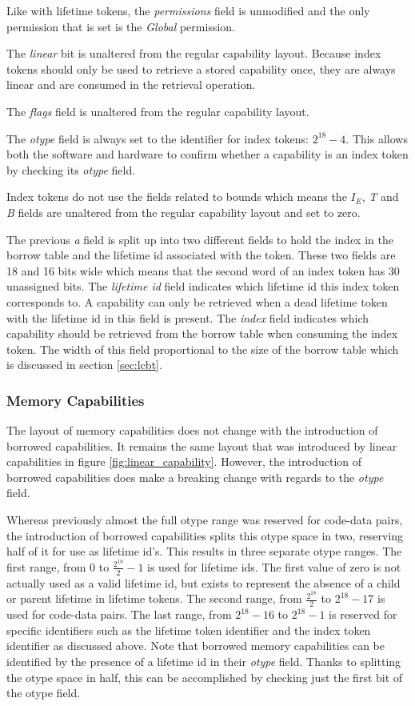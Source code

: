 Like with lifetime tokens, the \textit{permissions} field is unmodified and the only permission that is set is the \textit{Global} permission.

The \textit{linear} bit is unaltered from the regular capability layout. Because index tokens should only be used to retrieve a stored capability once, they are always linear and are consumed in the retrieval operation.

The \textit{flags} field is unaltered from the regular capability layout.

The \textit{otype} field is always set to the identifier for index tokens: $2^{18} - 4$. This allows both the software and hardware to confirm whether a capability is an index token by checking its \textit{otype} field.

Index tokens do not use the fields related to bounds which means the $I_E$, \textit{T} and \textit{B} fields are unaltered from the regular capability layout and set to zero.

The previous \textit{a} field is split up into two different fields to hold the index in the borrow table and the lifetime id associated with the token. These two fields are 18 and 16 bits wide which means that the second word of an index token has 30 unassigned bits. The \textit{lifetime id} field indicates which lifetime id this index token corresponds to. A capability can only be retrieved when a dead lifetime token with the lifetime id in this field is present. The \textit{index} field indicates which capability should be retrieved from the borrow table when consuming the index token. The width of this field proportional to the size of the borrow table which is discussed in section \ref{sec:lcbt}.

\subsubsection{Memory Capabilities}
The layout of memory capabilities does not change with the introduction of borrowed capabilities. It remains the same layout that was introduced by linear capabilities in figure \ref{fig:linear_capability}. However, the introduction of borrowed capabilities does make a breaking change with regards to the \textit{otype} field.

Whereas previously almost the full otype range was reserved for code-data pairs, the introduction of borrowed capabilities splits this otype space in two, reserving half of it for use as lifetime id's. This results in three separate otype ranges. The first range, from 0 to $\frac{2^{18}}{2} - 1$ is used for lifetime ids. The first value of zero is not actually used as a valid lifetime id, but exists to represent the absence of a child or parent lifetime in lifetime tokens. The second range, from  $\frac{2^{18}}{2}$ to $2^{18} - 17$ is used for code-data pairs. The last range, from $2^{18} - 16$ to $2^{18} - 1$ is reserved for specific identifiers such as the lifetime token identifier and the index token identifier as discussed above. Note that borrowed memory capabilities can be identified by the presence of a lifetime id in their \textit{otype} field. Thanks to splitting the otype space in half, this can be accomplished by checking just the first bit of the otype field.

